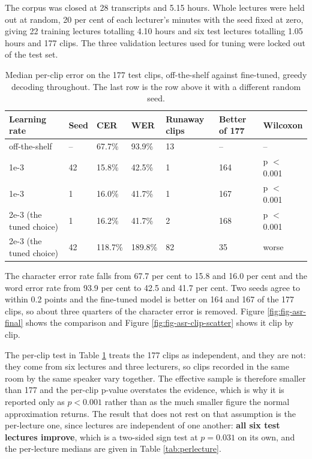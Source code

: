The corpus was closed at 28 transcripts and 5.15 hours. Whole lectures were held out at
random, 20 per cent of each lecturer's minutes with the seed fixed at zero, giving 22
training lectures totalling 4.10 hours and six test lectures totalling 1.05 hours and 177
clips. The three validation lectures used for tuning were locked out of the test set.

\begin{table}[htbp]
\centering
\caption[Median per-clip error on the 177 test clips]{Median per-clip error on the 177 test clips, off-the-shelf against fine-tuned,
greedy decoding throughout. The last row is the row above it with a different random
seed.}
\label{tab:asrfinal}
\small
\begin{tabular}{p{2.8cm}p{1.2cm}p{1.6cm}p{1.6cm}p{2.0cm}p{1.8cm}p{1.8cm}}
\toprule
Learning rate & Seed & CER & WER & Runaway clips & Better of 177 & Wilcoxon \\
\midrule
off-the-shelf & -- & 67.7\% & 93.9\% & 13 & -- & -- \\
1e-3 & 42 & 15.8\% & 42.5\% & 1 & 164 & p $<$ 0.001 \\
1e-3 & 1 & 16.0\% & 41.7\% & 1 & 167 & p $<$ 0.001 \\
2e-3 (the tuned choice) & 1 & 16.2\% & 41.7\% & 2 & 168 & p $<$ 0.001 \\
2e-3 (the tuned choice) & 42 & 118.7\% & 189.8\% & 82 & 35 & worse \\
\bottomrule
\end{tabular}
\end{table}

The character error rate falls from 67.7 per cent to 15.8 and 16.0 per cent and the word
error rate from 93.9 per cent to 42.5 and 41.7 per cent. Two seeds agree to within 0.2
points and the fine-tuned model is better on 164 and 167 of the 177 clips, so about three
quarters of the character error is removed. Figure \ref{fig:fig-asr-final} shows the
comparison and Figure \ref{fig:fig-asr-clip-scatter} shows it clip by clip.

The per-clip test in Table \ref{tab:asrfinal} treats the 177 clips as independent, and
they are not: they come from six lectures and three lecturers, so clips recorded in the
same room by the same speaker vary together. The effective sample is therefore smaller
than 177 and the per-clip p-value overstates the evidence, which is why it is reported
only as $p < 0.001$ rather than as the much smaller figure the normal approximation
returns. The result that does not rest on that assumption is the per-lecture one, since
lectures are independent of one another: \textbf{all six test lectures improve}, which is a
two-sided sign test at $p = 0.031$ on its own, and the per-lecture medians are given in
Table \ref{tab:perlecture}.


